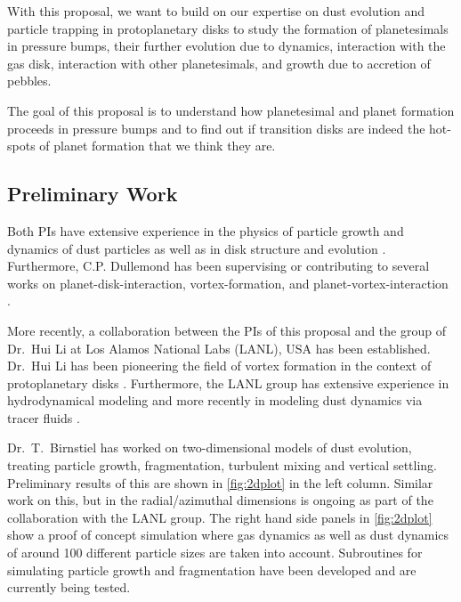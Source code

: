 \documentclass[10pt,fleqn,twoside]{article}
\begin{document}
With this proposal, we want to build on our expertise on dust
evolution and particle trapping in protoplanetary disks to study the
formation of planetesimals in pressure bumps, their further
evolution due to dynamics, interaction with the gas disk,
interaction with other planetesimals, and growth due to accretion of
pebbles.

\begin{highlight}
The goal of this proposal is to understand how planetesimal
and planet formation proceeds in pressure bumps and to find out
if transition disks are indeed the hot-spots of planet formation that
we think they are.
\end{highlight}

\subsection*{Preliminary Work}

Both PIs have extensive experience in the physics of particle growth
and dynamics of dust particles \citep[e..g][see
\citealp{2016SSRv..tmp...32B} for a recent
review]{2005A&A...434..971D, 2008A&A...480..859B, 2008A&A...489..931Z,
2010A&A...513A..79B, 2012A&A...539A.148B, 2014A&A...572A..78D} as well
as in disk structure and evolution \citep[e.g.,][and many
others]{2001ApJ...560..957D, 2002A&A...389..464D, 2004A&A...417..159D,
2010ARA&A..48..205D,2015ApJ...813L..14B}. Furthermore, C.P. Dullemond
has been supervising or contributing to several works on
planet-disk-interaction, vortex-formation, and
planet-vortex-interaction
\citep{2012MNRAS.419.1701R,2013A&A...553L...3A,2014A&A...572A..61A}.

More recently, a collaboration between the PIs of this proposal and
the group of Dr.\ Hui Li at Los Alamos National Labs (LANL), USA has
been established. Dr.\ Hui Li has been pioneering the field of
vortex formation in the context of protoplanetary disks
\citep{2001ApJ...551..874L,2000ApJ...533.1023L}. Furthermore, the LANL
group has extensive experience in hydrodynamical modeling and more
recently in modeling dust dynamics via tracer fluids
\citep[e.g.,][]{2014ApJ...795L..39F,2016ApJ...818...76J}.

Dr.\ T.\ Birnstiel has worked on two-dimensional models of dust
evolution, treating particle growth, fragmentation, turbulent mixing
and vertical settling. Preliminary results of this are shown in
\autoref{fig:2dplot} in the left column. Similar work on this, but in
the radial/azimuthal dimensions is ongoing as part of the collaboration
with the LANL group. The right hand side panels in \autoref{fig:2dplot}
show a proof of concept simulation where gas dynamics as well as dust
dynamics of around 100 different particle sizes are taken into
account. Subroutines for simulating particle growth and fragmentation
have been developed and are currently being tested.
\end{document}
